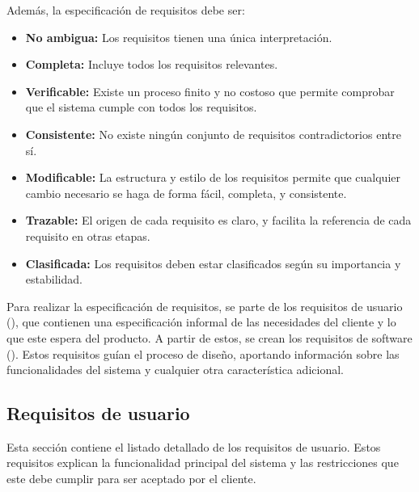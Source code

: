 \noindent
Además, la especificación de requisitos debe ser:

\begin{itemize}
    \item \textbf{No ambigua:} Los requisitos tienen una única interpretación.
    \item \textbf{Completa:} Incluye todos los requisitos relevantes.
    \item \textbf{Verificable:} Existe un proceso finito y no costoso que permite
    comprobar que el sistema cumple con todos los requisitos.
    \item \textbf{Consistente:} No existe ningún conjunto de requisitos contradictorios
    entre sí.
    \item \textbf{Modificable:} La estructura y estilo de los requisitos permite que
    cualquier cambio necesario se haga de forma fácil, completa, y consistente.
    \item \textbf{Trazable:} El origen de cada requisito es claro, y facilita la
    referencia de cada requisito en otras etapas.
    \item \textbf{Clasificada:} Los requisitos deben estar clasificados según su
    importancia y estabilidad.
\end{itemize}

Para realizar la especificación de requisitos, se parte de los requisitos de
usuario (), que contienen una especificación
informal de las necesidades del cliente y lo que este espera del producto. A
partir de estos, se crean los requisitos de software
(). Estos requisitos guían el proceso de
diseño, aportando información sobre las funcionalidades del sistema y cualquier
otra característica adicional.


\subsection{Requisitos de usuario}\label{subsec:user-requirements}

Esta sección contiene el listado detallado de los requisitos de usuario. Estos
requisitos explican la funcionalidad principal del sistema y las restricciones
que este debe cumplir para ser aceptado por el cliente.

